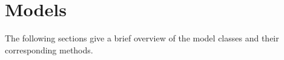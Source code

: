 
%
%
%

\chapter{Models}
\label{MODELS CHAPTER}

The following sections give a brief overview of the model classes and their
corresponding methods.

 
%

%

